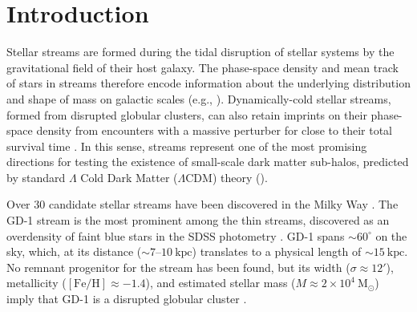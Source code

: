 \documentclass[modern]{aastex62}
\newcommand{\msun}{\textrm{M}_\odot}
\newcommand{\kpc}{\textrm{kpc}}
\newcommand{\feh}{\ensuremath{[\textrm{Fe} / \textrm{H}]}}
\begin{document}

\section{Introduction}
\label{sec:intro}

Stellar streams are formed during the tidal disruption of stellar systems by the
gravitational field of their host galaxy.
The phase-space density and mean track of stars in streams therefore encode
information about the underlying distribution and shape of mass on galactic
scales (e.g., \citealt{Johnston:1999, Bonaca:2018}).
Dynamically-cold stellar streams, formed from disrupted globular clusters, can
also retain imprints on their phase-space density from encounters with a massive
perturber for close to their total survival time \citep[e.g.,][]{Yoon:2011}.
In this sense, streams represent one of the most promising directions for
testing the existence of small-scale dark matter sub-halos, predicted by
standard $\Lambda$ Cold Dark Matter ($\Lambda$CDM) theory
(\citealt{Erkal:2015, Sanders:2016, Bovy:2017}).

Over 30 candidate stellar streams have been discovered in the Milky Way \citep[see][for a recent review]{Grillmair:2016, Newberg:2016}.
The GD-1 stream is the most prominent among the thin streams, discovered as an
overdensity of faint blue stars in the SDSS photometry \citep{Grillmair:2006}.
GD-1 spans $\sim 60^\circ$ on the sky, which, at its distance ($\sim
7$--$10~\textrm{kpc}$) translates to a physical length of $\sim 15~\kpc$.
No remnant progenitor for the stream has been found, but its width ($\sigma
\approx 12'$), metallicity ($\feh \approx -1.4$), and estimated stellar mass ($M
\approx 2 \times 10^4~\msun$) imply that GD-1 is a disrupted globular cluster
\citep{Koposov:2010}.
\end{document}
